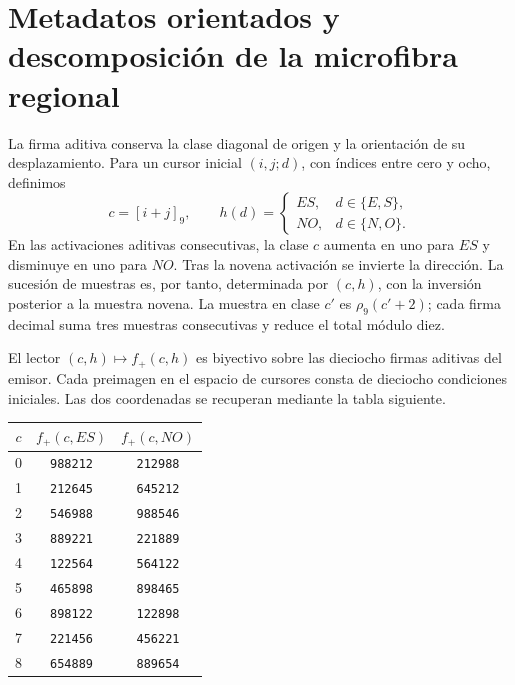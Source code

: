 \section{Metadatos orientados y descomposición de la microfibra regional}
\label{sec:microfibra-bipartita-explicita}

La firma aditiva conserva la clase diagonal de origen y la orientación
de su desplazamiento. Para un cursor inicial $(i,j;d)$, con índices entre
cero y ocho, definimos
\[
 c=[i+j]_9,\qquad
 h(d)=\begin{cases}ES,&d\in\{E,S\},\\NO,&d\in\{N,O\}.
 \end{cases}
\]
En las activaciones aditivas consecutivas, la clase $c$ aumenta en uno
para $ES$ y disminuye en uno para $NO$. Tras la novena activación se
invierte la dirección. La sucesión de muestras es, por tanto, determinada
por $(c,h)$, con la inversión posterior a la muestra novena. La muestra
en clase $c'$ es $\rho_9(c'+2)$; cada firma decimal suma tres muestras
consecutivas y reduce el total módulo diez.

\begin{proposition}
El lector $(c,h)\mapsto f_+(c,h)$ es biyectivo sobre las dieciocho
firmas aditivas del emisor. Cada preimagen en el espacio de cursores
consta de dieciocho condiciones iniciales. Las dos coordenadas se
recuperan mediante la tabla siguiente.
\end{proposition}

\begin{center}
\begin{tabular}{c|cc}
\toprule
$c$&$f_+(c,ES)$&$f_+(c,NO)$\\
\midrule
0&\texttt{988212}&\texttt{212988}\\
1&\texttt{212645}&\texttt{645212}\\
2&\texttt{546988}&\texttt{988546}\\
3&\texttt{889221}&\texttt{221889}\\
4&\texttt{122564}&\texttt{564122}\\
5&\texttt{465898}&\texttt{898465}\\
6&\texttt{898122}&\texttt{122898}\\
7&\texttt{221456}&\texttt{456221}\\
8&\texttt{654889}&\texttt{889654}\\
\bottomrule
\end{tabular}
\end{center}

